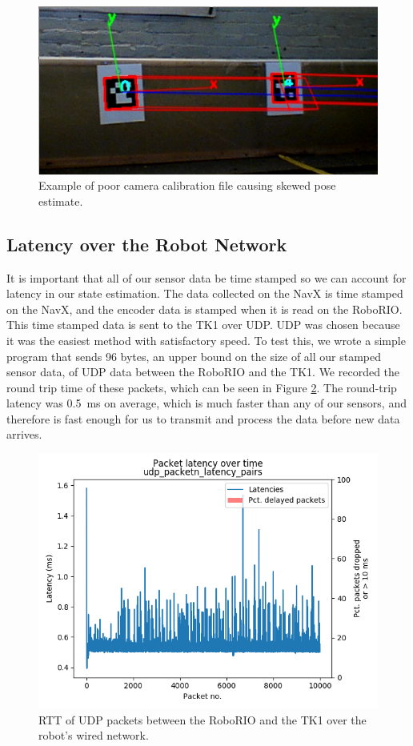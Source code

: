 \documentclass{article}
\begin{document}
    \begin{figure}[H]
      \centering
      \includegraphics[width=1\linewidth]{./images/bad_tag_pose_1.png}
      \caption{Example of poor camera calibration file causing skewed pose estimate.}
      \label{fig:bad_tag_pose}
    \end{figure}

	\subsection{Latency over the Robot Network}

		It is important that all of our sensor data be time stamped so we can account for latency in our state estimation. The data collected on the NavX is time stamped on the NavX, and the encoder data is stamped when it is read on the RoboRIO. This time stamped data is sent to the TK1 over UDP. UDP was chosen because it was the easiest method with satisfactory speed. To test this, we wrote a simple program that sends 96 bytes, an upper bound on the size of all our stamped sensor data, of UDP data between the RoboRIO and the TK1. We recorded the round trip time of these packets, which can be seen in Figure \ref{fig:udp_timing}. The round-trip latency was \SI{0.5}{\milli\second} on average, which is much faster than any of our sensors, and therefore is fast enough for us to transmit and process the data before new data arrives.

		\begin{figure}[H]
			\centering
			\includegraphics[width=0.7\linewidth]{./images/rio_tk1_udp_latency_timeseries.png}
			\caption{RTT of UDP packets between the RoboRIO and the TK1 over the robot's wired network.}
			\label{fig:udp_timing}
		\end{figure}
\end{document}
